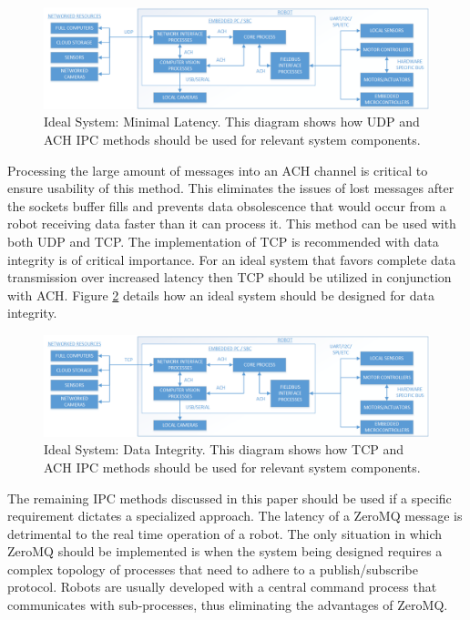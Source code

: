 \begin{figure}[t]
 \centering
 \includegraphics[width=2.0\columnwidth]{./images/idealsystem.png}
  \caption{Ideal System: Minimal Latency. This diagram shows how UDP and ACH IPC methods should be used for relevant system components.}
  \label{fig:idealsystem}
\end{figure}

  Processing the large amount of messages into an ACH channel is critical to ensure usability of this method. This eliminates the issues of lost messages after the sockets buffer fills and prevents data obsolescence that would occur from a robot receiving data faster than it can process it. This method can be used with both UDP and TCP. The implementation of TCP is recommended with data integrity is of critical importance. For an ideal system that favors complete data transmission over increased latency then TCP should be utilized in conjunction with ACH. Figure \ref{fig:idealsystemtcp} details how an ideal system should be designed for data integrity.

\begin{figure}[tbhp]
 \centering
 \includegraphics[width=2.0\columnwidth]{./images/idealsystem_integrity.png}
  \caption{Ideal System: Data Integrity. This diagram shows how TCP and ACH IPC methods should be used for relevant system components.}
  \label{fig:idealsystemtcp}
\end{figure} 

The remaining IPC methods discussed in this paper should be used if a specific requirement dictates a specialized approach. The latency of a ZeroMQ message is detrimental to the real time operation of a robot. The only situation in which ZeroMQ should be implemented is when the system being designed requires a complex topology of processes that need to adhere to a publish/subscribe protocol. Robots are usually developed with a central command process that communicates with sub-processes, thus eliminating the advantages of ZeroMQ. 

